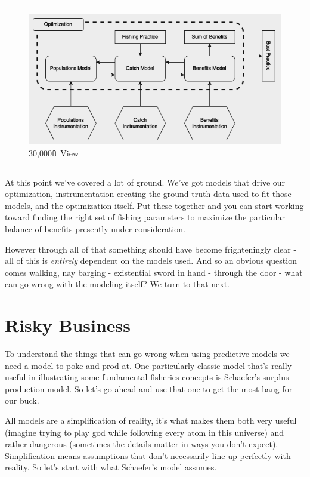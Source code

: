 \documentclass[11pt,a5paper]{book}
\begin{document}
\noindent \rule{\textwidth}{0.5pt} 
\begin{figure}[h!] 
  \includegraphics[width=\linewidth]{drawings/high_level.png}
  \caption{30,000ft View}
  \label{fig:high_level}
\end{figure}
\newline
\rule{\textwidth}{0.5pt} 
\vspace{5pt}

At this point we've covered a lot of ground. We've got models that drive our optimization, instrumentation creating the ground truth data used to fit those models, and the optimization itself. Put these together and you can start working toward finding the right set of fishing parameters to maximize the particular balance of benefits presently under consideration. 
\newline

However through all of that something should have become frighteningly clear - all of this is \textit{entirely} dependent on the models used. And so an obvious question comes walking, nay barging - existential sword in hand - through the door - what can go wrong with the modeling itself? We turn to that next. 
\newpage

\section{Risky Business}
To understand the things that can go wrong when using predictive models we need a model to poke and prod at. One particularly classic model that's really useful in illustrating some fundamental fisheries concepts is Schaefer's surplus production model. So let's go ahead and use that one to get the most bang for our buck.
\newline

All models are a simplification of reality, it's what makes them both very useful (imagine trying to play god while following every atom in this universe) and rather dangerous (sometimes the details matter in ways you don't expect). Simplification means assumptions that don't necessarily line up perfectly with reality. So let's start with what Schaefer's model assumes. 
\newline
\end{document}
